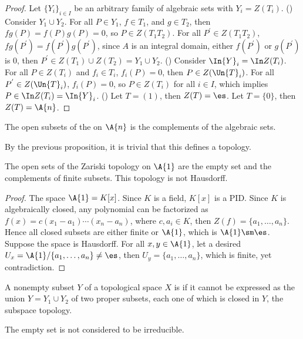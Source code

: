\documentclass[10pt]{article}
\begin{document}
\begin{proof}
    Let ${\{{Y}_{i}\}}_{i\in I}$ be an arbitrary family of algebraic sets with ${Y}_{i}=Z({T}_{i})$. 
    () Consider ${Y}_{1}\cup{Y}_{2}$. For all $P\in{Y}_{1}$, $f\in{T}_{1}$, and $g\in{T}_{2}$, then $fg(P)=f(P)g(P)=0$, so $P\in Z({T}_{1}{T}_{2})$. For all ${P}^{'}\in Z({T}_{1}{T}_{2})$, $fg({P}^{'})=f({P}^{'})g({P}^{'})$, since $A$ is an integral domain, either $f({P}^{'})$ or $g({P}^{'})$ is 0, then ${P}^{'}\in Z({T}_{1})\cup Z({T}_{2})={Y}_{1}\cup{Y}_{2}$. () Consider $\In{Y}_{i}=\In Z({T}_{i})$. For all $P\in Z({T}_{i})$ and ${f}_{i}\in{T}_{i}$, ${f}_{i}(P)=0$, then $P\in Z(\Un{T}_{i})$. For all ${P}^{'}\in Z(\Un{T}_{i})$, ${f}_{i}(P)=0$, so $P\in Z({T}_{i})$ for all $i\in I$, which implies $P\in\In Z({T}_{i})=\In{Y}_{i}$. () Let $T=(1)$, then $Z(T)=\es$. Let $T=\{0\}$, then $Z(T)=\A{n}$.
\end{proof}
\begin{definition}
    The open subsets of the  on $\A{n}$ is the complements of the algebraic sets.
\end{definition}
\par
By the previous proposition, it is trivial that this defines a topology.
\begin{example}
    The open sets of the Zariski topology on $\A{1}$ are the empty set and the complements of finite subsets. This topology is not Hausdorff.
\end{example}
\begin{proof}
    The space $\A{1}=K[x]$. Since $K$ is a field, $K[x]$ is a PID. Since $K$ is algebraically closed, any polynomial can be factorized as $f(x)=c({x}_{1}-{a}_{1})\cdots({x}_{n}-{a}_{n})$, where $c,{a}_{i}\in K$, then $Z(f)=\{{a}_{1},\dots,{a}_{n}\}$. Hence all closed subsets are either finite or $\A{1}$, which is $\A{1}\sm\es$. Suppose the space is Hausdorff. For all $x,y\in\A{1}$, let a desired ${U}_{x}=\A{1}/\{{a}_{1},\dots,{a}_{n}\}\ne\es$, then ${U}_{y}=\{{a}_{1},\dots,{a}_{n}\}$, which is finite, yet contradiction.
\end{proof}
\begin{definition}
    A nonempty subset $Y$ of a topological space $X$ is  if it cannot be expressed as the union $Y={Y}_{1}\cup{Y}_{2}$ of two proper subsets, each one of which is closed in $Y$, the subspace topology.
\end{definition}
\begin{remark}
    The empty set is not considered to be irreducible.
\end{remark}
\end{document}
